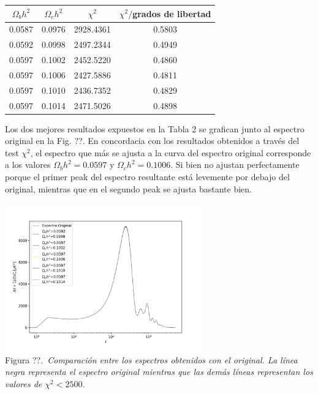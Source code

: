 \documentclass[twocolumn,letterpaper,spanish]{revtex4}
\numberwithin{equation}{section}
\begin{document}
\begin{center}
\begin{tabular}{| c | c | c | c |}\hline
$\Omega_b h^2$ & $\Omega_c h^2$ & $\chi^2$ & $\chi^2/$grados de libertad       \\ \hline
	\hspace{0.1cm}0.0587   & \hspace{0.1cm}0.0976 & \hspace{0.1cm}2928.4361  & 0.5803  \\
	0.0592   & 0.0998 & 2497.2344  & 0.4949  \\
	0.0597   & 0.1002 & 2452.5220  & 0.4860  \\
	0.0597   & 0.1006 & 2427.5886  & 0.4811  \\
	0.0597   & 0.1010 & 2436.7352  & 0.4829  \\
	0.0597   & 0.1014 & 2471.5026  & 0.4898   \\\hline
\end{tabular}\label{tabla3}
\end{center}

Los dos mejores resultados expuestos en la Tabla 2 se grafican junto al espectro original en la Fig. ??. En concordacia con los resultados obtenidos a trav\'es del test $\chi^2$, el espectro que m\'as se ajusta a la curva del espectro original corresponde a los valores $\Omega_b h^2=0.0597$ y $\Omega_c h^2=0.1006$. Si bien no ajustan perfectamente porque el primer peak del espectro resultante est\'a levemente por debajo del original, mientras que en el segundo peak se ajusta bastante bien.
\begin{center}
   \includegraphics[width=85mm]{comparacion.png}\\
   Figura ??.\emph{\ Comparaci\'on entre los espectros obtenidos con el original. La l\'inea negra representa el espectro original mientras que las dem\'as l\'ineas representan los valores de $\chi^2<2500$.}%
\end{center}
\end{document}
